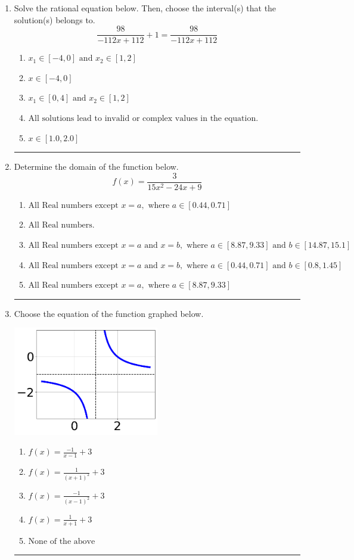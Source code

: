 \documentclass[14pt]{extbook}
\newcommand{\litem}[1]{\item#1\hspace*{-1cm}\rule{\textwidth}{0.4pt}}
\begin{document}
\begin{enumerate}
{\begin{enumerate}[label=\Alph*.]
\end{enumerate} }
\litem{
Solve the rational equation below. Then, choose the interval(s) that the solution(s) belongs to.\[ \frac{98}{-112x + 112} + 1 = \frac{98}{-112x + 112} \]\begin{enumerate}[label=\Alph*.]
\item \( x_1 \in [-4, 0] \text{ and } x_2 \in [1,2] \)
\item \( x \in [-4,0] \)
\item \( x_1 \in [0, 4] \text{ and } x_2 \in [1,2] \)
\item \( \text{All solutions lead to invalid or complex values in the equation.} \)
\item \( x \in [1.0,2.0] \)

\end{enumerate} }
\litem{
Determine the domain of the function below.\[ f(x) = \frac{3}{15x^{2} -24 x + 9} \]\begin{enumerate}[label=\Alph*.]
\item \( \text{All Real numbers except } x = a, \text{ where } a \in [0.44, 0.71] \)
\item \( \text{All Real numbers.} \)
\item \( \text{All Real numbers except } x = a \text{ and } x = b, \text{ where } a \in [8.87, 9.33] \text{ and } b \in [14.87, 15.1] \)
\item \( \text{All Real numbers except } x = a \text{ and } x = b, \text{ where } a \in [0.44, 0.71] \text{ and } b \in [0.8, 1.45] \)
\item \( \text{All Real numbers except } x = a, \text{ where } a \in [8.87, 9.33] \)

\end{enumerate} }
\litem{
Choose the equation of the function graphed below.
\begin{center}
    \includegraphics[width=0.5\textwidth]{../Figures/rationalGraphToEquationCopyA.png}
\end{center}
\begin{enumerate}[label=\Alph*.]
\item \( f(x) = \frac{-1}{x - 1} + 3 \)
\item \( f(x) = \frac{1}{(x + 1)^2} + 3 \)
\item \( f(x) = \frac{-1}{(x - 1)^2} + 3 \)
\item \( f(x) = \frac{1}{x + 1} + 3 \)
\item \( \text{None of the above} \)


\end{enumerate}}
\end{enumerate}
\end{document}
